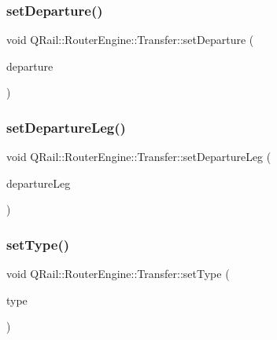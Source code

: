\mbox{\label{classQRail_1_1RouterEngine_1_1Transfer_aa2fc712b52826e04886c083fd54b12eb}} 
\subsubsection{\texorpdfstring{setDeparture()}{setDeparture()}}
{\footnotesize\ttfamily void Q\+Rail\+::\+Router\+Engine\+::\+Transfer\+::set\+Departure (\begin{DoxyParamCaption}\item[{\mbox{\hyperlink{classQRail_1_1RouterEngine_1_1RouteLegEnd}{Q\+Rail\+::\+Router\+Engine\+::\+Route\+Leg\+End}} $\ast$}]{departure }\end{DoxyParamCaption})}

\mbox{\label{classQRail_1_1RouterEngine_1_1Transfer_a6859f11de7d52221dedf2992c0574e01}} 
\subsubsection{\texorpdfstring{setDepartureLeg()}{setDepartureLeg()}}
{\footnotesize\ttfamily void Q\+Rail\+::\+Router\+Engine\+::\+Transfer\+::set\+Departure\+Leg (\begin{DoxyParamCaption}\item[{\mbox{\hyperlink{classQRail_1_1RouterEngine_1_1RouteLeg}{Q\+Rail\+::\+Router\+Engine\+::\+Route\+Leg}} $\ast$}]{departure\+Leg }\end{DoxyParamCaption})}

\mbox{\label{classQRail_1_1RouterEngine_1_1Transfer_a336a593cb84d879794a7ab7275ef6b08}} 
\subsubsection{\texorpdfstring{setType()}{setType()}}
{\footnotesize\ttfamily void Q\+Rail\+::\+Router\+Engine\+::\+Transfer\+::set\+Type (\begin{DoxyParamCaption}\item[{const \mbox{\hyperlink{classQRail_1_1RouterEngine_1_1Transfer_a5a0b372acbdfb9381fb937bf163edfa6}{Q\+Rail\+::\+Router\+Engine\+::\+Transfer\+::\+Type}} \&}]{type }\end{DoxyParamCaption})}

